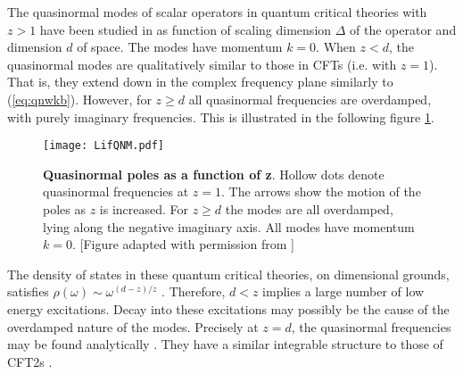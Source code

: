 \documentclass[10pt, oneside]{book}
\begin{document}
\begin{doublespace}
The quasinormal modes of scalar operators in quantum critical theories with $z>1$ have been studied in \cite{Sybesma:2015oha} as function of scaling dimension $\Delta$ of the operator and dimension $d$ of space. The modes have momentum $k=0$. When $z < d$, the quasinormal modes are qualitatively similar to those in CFTs (i.e. with $z=1$). That is, they extend down in the complex frequency plane similarly to (\ref{eq:qnwkb}). However, for $z \geq d$ all quasinormal frequencies are overdamped, with purely imaginary frequencies. This is illustrated in the following figure \ref{fig:LifQNM}.
\begin{figure}[h]
\centering
\texttt{[image: LifQNM.pdf]}
\caption{\label{fig:LifQNM} {\bf Quasinormal poles as a function of z}. Hollow dots denote quasinormal frequencies at $z=1$. The arrows show the motion of the poles as $z$ is increased. For $z\geq d$ the modes are all overdamped, lying along the negative imaginary axis. All modes have momentum $k=0$. [Figure adapted with permission from \cite{Sybesma:2015oha}]}
\end{figure}
The density of states in these quantum critical theories, on dimensional grounds, satisfies $\rho(\omega) \sim \omega^{(d-z)/z}$ \cite{Sybesma:2015oha}. Therefore, $d<z$ implies a large number of low energy excitations. Decay into these excitations may possibly be the cause of the overdamped nature of the modes.
Precisely at $z=d$, the quasinormal frequencies may be found analytically \cite{Sybesma:2015oha}. They have a similar integrable structure to those of CFT2s \cite{Birmingham:2001pj,Son:2002sd}. 


\end{doublespace}
\end{document}
